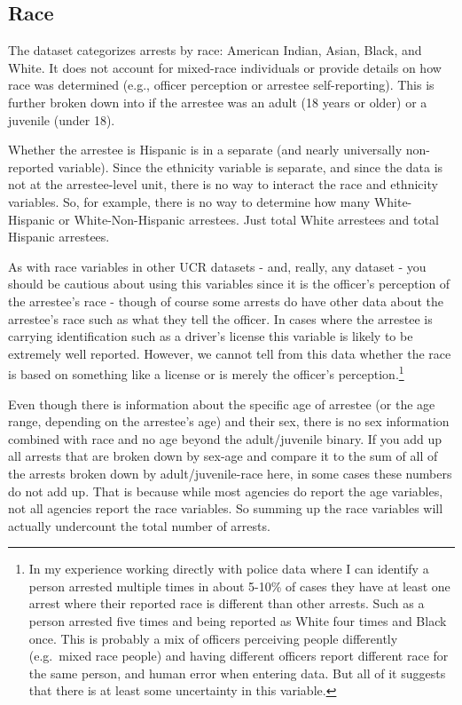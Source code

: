 \documentclass[
]{krantz}
\begin{document}
\subsection{Race}\label{race}

The dataset categorizes arrests by race: American Indian,
Asian, Black, and White. It does not account for mixed-race
individuals or provide details on how race was determined
(e.g., officer perception or arrestee self-reporting). This
is further broken down into if the arrestee was an adult (18
years or older) or a juvenile (under 18).

Whether the arrestee is Hispanic is in a separate (and
nearly universally non-reported variable). Since the
ethnicity variable is separate, and since the data is not at
the arrestee-level unit, there is no way to interact the
race and ethnicity variables. So, for example, there is no
way to determine how many White-Hispanic or
White-Non-Hispanic arrestees. Just total White arrestees and
total Hispanic arrestees.

As with race variables in other UCR datasets - and, really,
any dataset - you should be cautious about using this
variables since it is the officer's perception of the
arrestee's race - though of course some arrests do have
other data about the arrestee's race such as what they tell
the officer. In cases where the arrestee is carrying
identification such as a driver's license this variable is
likely to be extremely well reported. However, we cannot
tell from this data whether the race is based on something
like a license or is merely the officer's
perception.\footnote{In my experience working directly with
  police data where I can identify a person arrested
  multiple times in about 5-10\% of cases they have at least
  one arrest where their reported race is different than
  other arrests. Such as a person arrested five times and
  being reported as White four times and Black once. This is
  probably a mix of officers perceiving people differently
  (e.g.~mixed race people) and having different officers
  report different race for the same person, and human error
  when entering data. But all of it suggests that there is
  at least some uncertainty in this variable.}

Even though there is information about the specific age of
arrestee (or the age range, depending on the arrestee's age)
and their sex, there is no sex information combined with
race and no age beyond the adult/juvenile binary. If you add
up all arrests that are broken down by sex-age and compare
it to the sum of all of the arrests broken down by
adult/juvenile-race here, in some cases these numbers do not
add up. That is because while most agencies do report the
age variables, not all agencies report the race variables.
So summing up the race variables will actually undercount
the total number of arrests.
\end{document}
